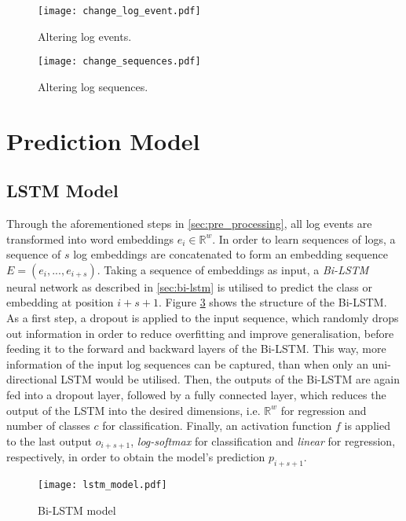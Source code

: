 \begin{figure}[H]
	\centering
	\texttt{[image: change\_log\_event.pdf]}
	\caption{Altering log events.}
	\label{fig:changelogevent}
\end{figure}

\begin{figure}[H]
	\centering
	\texttt{[image: change\_sequences.pdf]}
	\caption{Altering log sequences.}
	\label{fig:changesequence}
\end{figure}




\section{Prediction Model\label{sec:prediction_model}}

\subsection{LSTM Model\label{sec:lstm-model}}
Through the aforementioned steps in \ref{sec:pre_processing}, all log events are transformed into word embeddings $e_i \in \mathbb{R}^w$. In order to learn sequences of logs, a sequence of $s$ log embeddings are concatenated to form an embedding sequence $E = (e_i,...,e_{i+s})$. Taking a sequence of embeddings as input, a \textit{Bi-LSTM} neural network as described in \ref{sec:bi-lstm} is utilised to predict the class or embedding at position $i+s+1$. Figure \ref{fig:lstm_model} shows the structure of the Bi-LSTM. As a first step, a dropout is applied to the input sequence, which randomly drops out information in order to reduce overfitting and improve generalisation, before feeding it to the forward and backward layers of the Bi-LSTM. This way, more information of the input log sequences can be captured, than when only an uni-directional LSTM would be utilised. Then, the outputs of the Bi-LSTM are again fed into a dropout layer, followed by a fully connected layer, which reduces the output of the LSTM into the desired dimensions, i.e. $\mathbb{R}^w$ for regression and number of classes $c$ for classification. Finally, an activation function $f$ is applied to the last output $o_{i+s+1}$, \textit{log-softmax} for classification and \textit{linear} for regression, respectively, in order to obtain the model's prediction $p_{i+s+1}$.


\begin{figure}[H]
	\centering	
	\texttt{[image: lstm\_model.pdf]}
	\caption{Bi-LSTM model}
	\label{fig:lstm_model}
\end{figure}


